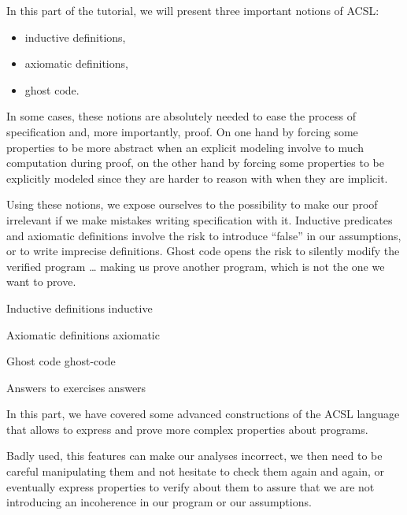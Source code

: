 In this part of the tutorial, we will present three important notions of ACSL:

\begin{itemize}
\item inductive definitions,
\item axiomatic definitions,
\item ghost code.
\end{itemize}


In some cases, these notions are absolutely needed to ease the process of
specification and, more importantly, proof. On one hand by forcing some
properties to be more abstract when an explicit modeling involve to much
computation during proof, on the other hand by forcing some properties to be
explicitly modeled since they are harder to reason with when they are implicit.

Using these notions, we expose ourselves to the possibility to make our
proof irrelevant if we make mistakes writing specification with it. Inductive
predicates and axiomatic definitions involve the risk to introduce ``false'' in
our assumptions, or to write imprecise definitions. Ghost code opens the risk
to silently modify the verified program \ldots{} making us prove another program,
which is not the one we want to prove.


\begin{levelTwo}
  {Inductive definitions}
  {inductive}
\end{levelTwo}

\begin{levelTwo}
  {Axiomatic definitions}
  {axiomatic}
\end{levelTwo}

\begin{levelTwo}
  {Ghost code}
  {ghost-code}
\end{levelTwo}

\begin{levelTwo}
  {Answers to exercises}
  {answers}
\end{levelTwo}


\horizontalLine



In this part, we have covered some advanced constructions of the ACSL
language that allows to express and prove more complex properties about
programs.

Badly used, this features can make our analyses incorrect, we then need
to be careful manipulating them and not hesitate to check them again and
again, or eventually express properties to verify about them to assure
that we are not introducing an incoherence in our program or our
assumptions.
